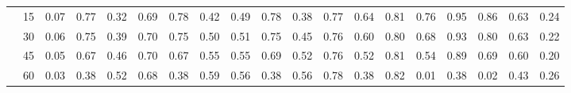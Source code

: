 \begin{table}
{\begin{tabular}[t]{ccccccccccccccccccc}
			& 15 & 0.07 & 0.77 & 0.32 & 0.69 & 0.78 & 0.42 & 0.49 & 0.78 & 0.38 & 0.77 & 0.64 & 0.81 & 0.76 & 0.95 & 0.86 & 0.63 & 0.24\\
			
			& 30 & 0.06 & 0.75 & 0.39 & 0.70 & 0.75 & 0.50 & 0.51 & 0.75 & 0.45 & 0.76 & 0.60 & 0.80 & 0.68 & 0.93 & 0.80 & 0.63 & 0.22\\
			
			& 45 & 0.05 & 0.67 & 0.46 & 0.70 & 0.67 & 0.55 & 0.55 & 0.69 & 0.52 & 0.76 & 0.52 & 0.81 & 0.54 & 0.89 & 0.69 & 0.60 & 0.20\\
			
			\multirow{-5}{*}{\centering\arraybackslash 0.33} & 60 & 0.03 & 0.38 & 0.52 & 0.68 & 0.38 & 0.59 & 0.56 & 0.38 & 0.56 & 0.78 & 0.38 & 0.82 & 0.01 & 0.38 & 0.02 & 0.43 & 0.26\\
			\bottomrule
	\end{tabular}}
\end{table}

